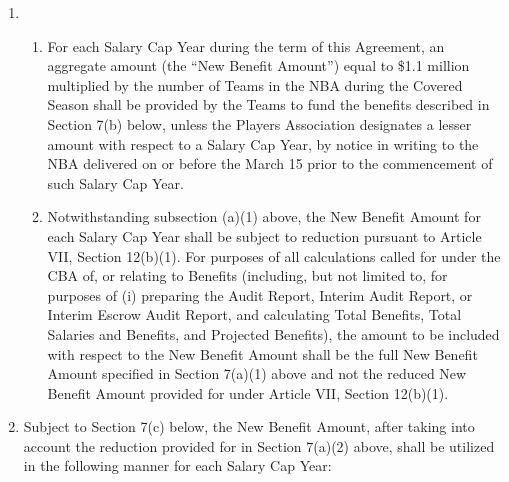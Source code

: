\documentclass[
]{book}
\providecommand{\tightlist}{%
  \setlength{\itemsep}{0pt}\setlength{\parskip}{0pt}}
\begin{document}
\begin{enumerate}
\def\labelenumi{(\alph{enumi})}
\item
  \begin{enumerate}
  \def\labelenumii{(\arabic{enumii})}
  \tightlist
  \item
    For each Salary Cap Year during the term of this Agreement, an aggregate amount (the ``New Benefit Amount'') equal to \$1.1 million multiplied by the number of Teams in the NBA during the Covered Season shall be provided by the Teams to fund the benefits described in Section 7(b) below, unless the Players Association designates a lesser amount with respect to a Salary Cap Year, by notice in writing to the NBA delivered on or before the March 15 prior to the commencement of such Salary Cap Year.
  \item
    Notwithstanding subsection (a)(1) above, the New Benefit Amount for each Salary Cap Year shall be subject to reduction pursuant to Article VII, Section 12(b)(1). For purposes of all calculations called for under the CBA of, or relating to Benefits (including, but not limited to, for purposes of (i) preparing the Audit Report, Interim Audit Report, or Interim Escrow Audit Report, and calculating Total Benefits, Total Salaries and Benefits, and Projected Benefits), the amount to be included with respect to the New Benefit Amount shall be the full New Benefit Amount specified in Section 7(a)(1) above and not the reduced New Benefit Amount provided for under Article VII, Section 12(b)(1).
  \end{enumerate}
\item
  Subject to Section 7(c) below, the New Benefit Amount, after taking into account the reduction provided for in Section 7(a)(2) above, shall be utilized in the following manner for each Salary Cap Year:


\end{enumerate}
\end{document}
